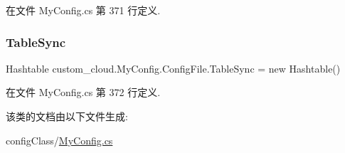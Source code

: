 在文件 My\+Config.\+cs 第 371 行定义.

\mbox{\label{classcustom__cloud_1_1_my_config_1_1_config_file_a2fbd02f1222a0e986b70b7d47ebc0071}} 
\subsubsection{\texorpdfstring{Table\+Sync}{TableSync}}
{\footnotesize\ttfamily Hashtable custom\+\_\+cloud.\+My\+Config.\+Config\+File.\+Table\+Sync = new Hashtable()}



在文件 My\+Config.\+cs 第 372 行定义.



该类的文档由以下文件生成\+:\begin{DoxyCompactItemize}
\item 
config\+Class/\hyperlink{_my_config_8cs}{My\+Config.\+cs}\end{DoxyCompactItemize}
